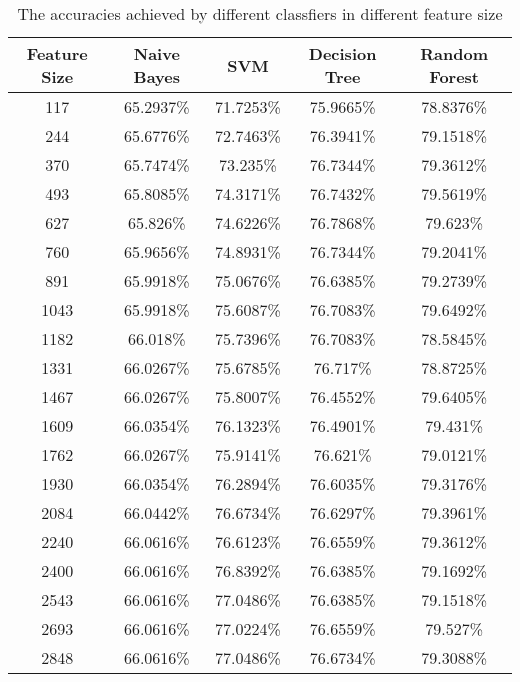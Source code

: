 \documentclass[12pt]{article}
\begin{document}
\begin{table}
\begin{center}
    \begin{tabular}{ | c || c | c | c | c | }
        \hline
        \textbf{Feature Size} & \textbf{Naive Bayes} & \textbf{SVM} & \textbf{Decision Tree} & \textbf{Random Forest} \\ \hline
        \hline
        117 & 65.2937\% & 71.7253\% & 75.9665\% & 78.8376\% \\ \hline
        244 & 65.6776\% & 72.7463\% & 76.3941\% & 79.1518\% \\ \hline
        370 & 65.7474\% & 73.235\% & 76.7344\% & 79.3612\% \\ \hline
        493 & 65.8085\% & 74.3171\% & 76.7432\% & 79.5619\% \\ \hline
        627 & 65.826\% & 74.6226\% & 76.7868\% & 79.623\% \\ \hline
        760 & 65.9656\% & 74.8931\% & 76.7344\% & 79.2041\% \\ \hline
        891 & 65.9918\% & 75.0676\% & 76.6385\% & 79.2739\% \\ \hline
        1043 & 65.9918\% & 75.6087\% & 76.7083\% & 79.6492\% \\ \hline
        1182 & 66.018\% & 75.7396\% & 76.7083\% & 78.5845\% \\ \hline
        1331 & 66.0267\% & 75.6785\% & 76.717\% & 78.8725\% \\ \hline
        1467 & 66.0267\% & 75.8007\% & 76.4552\% & 79.6405\% \\ \hline
        1609 & 66.0354\% & 76.1323\% & 76.4901\% & 79.431\% \\ \hline
        1762 & 66.0267\% & 75.9141\% & 76.621\% & 79.0121\% \\ \hline
        1930 & 66.0354\% & 76.2894\% & 76.6035\% & 79.3176\% \\ \hline
        2084 & 66.0442\% & 76.6734\% & 76.6297\% & 79.3961\% \\ \hline
        2240 & 66.0616\% & 76.6123\% & 76.6559\% & 79.3612\% \\ \hline
        2400 & 66.0616\% & 76.8392\% & 76.6385\% & 79.1692\% \\ \hline
        2543 & 66.0616\% & 77.0486\% & 76.6385\% & 79.1518\% \\ \hline
        2693 & 66.0616\% & 77.0224\% & 76.6559\% & 79.527\% \\ \hline
        2848 & 66.0616\% & 77.0486\% & 76.6734\% & 79.3088\% \\ \hline
    \end{tabular}
\caption{The accuracies achieved by different classfiers in different feature size}
\label{classifiers-feature-size-tbl}
\end{center}
\end{table}
\end{document}

